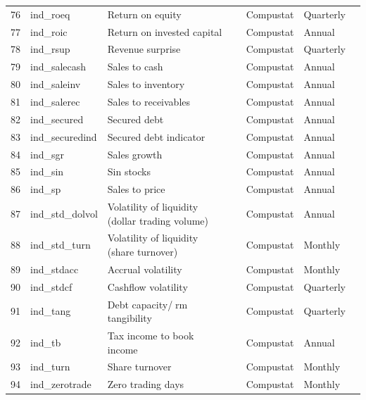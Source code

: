 \documentclass[11pt, a4paper, table]{article}
\begin{document}
\begin{landscape}
\begin{center}
\begin{longtable}{lllllll}
			76 & ind\_roeq & Return on equity & 
				\cite{hou_digesting_2015} & Compustat & Quarterly \\
			77 & ind\_roic & Return on invested capital & 
				\cite{brown_productivity_2007} & Compustat & Annual \\
			78 & ind\_rsup & Revenue surprise & 
				\cite{kama_market_2009} & Compustat & Quarterly \\
			79 & ind\_salecash & Sales to cash & 
				\cite{ou_financial_1989} & Compustat & Annual \\
			80 & ind\_saleinv\footnotemark[\value{footnote}] & Sales to inventory & 
				\cite{ou_financial_1989} & Compustat & Annual \\
			81 & ind\_salerec & Sales to receivables & 
				\cite{ou_financial_1989} & Compustat & Annual \\
			82 & ind\_secured\footnotemark[\value{footnote}] & Secured debt & 
				\cite{valta_strategic_2016} & Compustat & Annual \\
			83 & ind\_securedind & Secured debt indicator & 
				\cite{valta_strategic_2016} & Compustat & Annual \\
			84 & ind\_sgr\footnotemark[\value{footnote}] & Sales growth & 
				\cite{barbee_jr_salesprice_1996} & Compustat & Annual \\
			85 & ind\_sin & Sin stocks & 
				\cite{hong_price_2009} & Compustat & Annual \\
			86 & ind\_sp & Sales to price & 
				\cite{barbee_jr_salesprice_1996} & Compustat & Annual \\
			87 & ind\_std\_dolvol & Volatility of liquidity (dollar trading volume) & 
				\cite{chordia_trading_2001} & Compustat & Annual \\
			88 & ind\_std\_turn & Volatility of liquidity (share turnover) & 
				\cite{chordia_trading_2001} & Compustat & Monthly \\
			89 & ind\_stdacc\footnotemark[\value{footnote}] & Accrual volatility & 
				\cite{bandyopadhyay_accrual_2010} & Compustat & Monthly \\
			90 & ind\_stdcf\footnotemark[\value{footnote}] & Cashflow volatility & 
				\cite{huang_cross_2009} & Compustat & Quarterly \\
			91 & ind\_tang & Debt capacity/rm tangibility & 
				\cite{almeida_financial_2007} & Compustat & Quarterly \\
			92 & ind\_tb\footnotemark[\value{footnote}] & Tax income to book income & 
				\cite{lev_market-based_1982} & Compustat & Annual \\
			93 & ind\_turn & Share turnover & 
				\cite{datar_liquidity_1998} & Compustat & Monthly \\
			94 & ind\_zerotrade & Zero trading days & 
				\cite{liu_liquidity-augmented_2006} & Compustat & Monthly \\ \hline	
		\end{longtable}
	\end{center}
\end{landscape}
\end{document}
